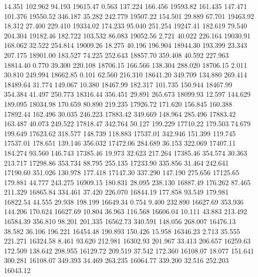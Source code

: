   14.351  102.962   94.193     19615.47
   0.563  137.224  166.456     19593.82
 161.435  147.471  101.376     19550.52
 346.187   35.282  242.779     19507.22
 154.501   29.889   67.701     19463.92
  18.312   27.400  229.410     19334.02
 174.233   95.040  251.254     19247.41
 182.619   79.540  204.304     19182.46
 182.722  103.532   86.083     19052.56
   2.721   40.022  226.164     19030.91
 168.062   32.522  254.814     19009.26
  18.275   40.196  196.904     18944.30
 193.399   23.343  207.175     18901.00
 183.527   74.225  252.643     18857.70
 359.408   40.592  227.963     18814.40
   0.770   39.300  220.108     18706.15
 166.566  138.304  288.020     18706.15
   2.011   30.810  249.994     18662.85
   0.101   62.560  216.310     18641.20
 349.709  134.880  269.414     18489.64
  31.774  149.067   10.380     18467.99
 182.317  101.735  150.944     18467.99
 354.384   41.497  250.773     18316.44
 356.451   29.891  265.673     18099.93
  12.597  144.629  189.095     18034.98
 170.659   80.890  219.235     17926.72
 171.620  156.845  160.388     17892.44
 162.496   30.035  246.223     17883.42
 349.669  148.964  285.496     17883.42
 163.487   40.073  249.522     17818.47
 342.764   50.127  199.229     17710.22
 179.503   74.679  199.649     17623.62
 318.577  148.739  118.883     17537.01
 342.946  151.399  119.745     17537.01
 178.651  139.146  356.032     17472.06
 284.689   36.153  322.069     17407.11
 184.274   93.560  146.743     17385.46
  19.973   32.623  217.264     17385.46
 354.574   30.363  213.717     17298.86
 353.734   88.795  255.135     17233.90
 335.856   31.464  242.641     17190.60
 351.026  130.978  177.418     17147.30
 337.290  147.190  275.656     17125.65
 179.881   44.777  243.275     16909.15
 180.831   28.095  238.130     16887.49
 176.262   87.465  211.329     16865.84
 334.461   37.420  226.070     16844.19
 177.858   93.549  179.981     16822.54
  44.555   29.938  198.199     16649.34
   0.754    9.400  232.890     16627.69
 353.936  144.206  170.624     16627.69
  10.804   36.963  116.568     16606.04
  10.111   43.883  213.492     16584.39
 356.810   98.201  201.335     16562.73
 340.591  148.056  268.007     16476.13
  38.582   36.106  196.221     16454.48
 190.893  150.426   15.958     16346.23
   2.713   35.555  221.271     16324.58
   8.461   93.620  212.981     16302.93
 201.967   33.413  206.657     16259.63
 172.509  138.642  298.955     16129.72
 209.519   37.542  172.360     16108.07
  18.077  151.641  300.281     16108.07
 349.393   34.469  263.235     16064.77
 339.200   32.516  252.203     16043.12

